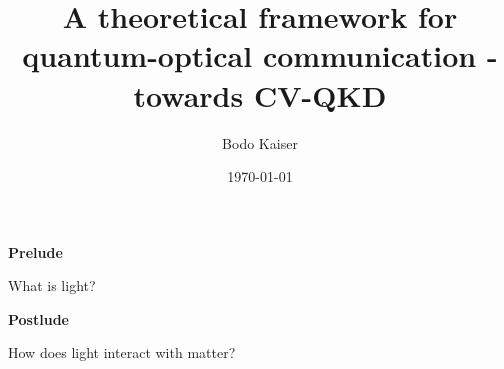 \documentclass{beamer}
\title{A theoretical framework for quantum-optical communication - towards CV-QKD}
\date{\today}
\author{Bodo Kaiser}
\institute{Ludwig-Maximilians-Universität München}
\begin{document}
	\maketitle
	
	\begin{frame}
		\begin{center}
			\textbf{Prelude}
			
			What is light?
		\end{center}
	\end{frame}
	
	\begin{frame}
		\begin{center}
			\textbf{Postlude}
			
			How does light interact with matter?
		\end{center}
	\end{frame}
\end{document}
